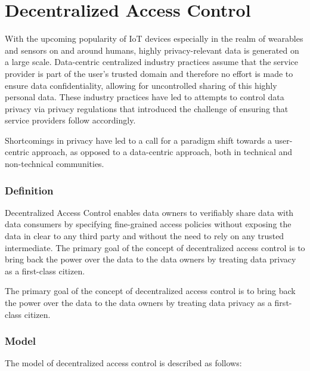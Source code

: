 \documentclass[conference]{IEEEtran}
\begin{document}
\section{Decentralized Access Control}
With the upcoming popularity of IoT devices especially in the realm of wearables and sensors on and around humans, highly privacy-relevant data is generated on a large scale. \cite{zhang_cloud_2015}
Data-centric centralized industry practices assume that the service provider is part of the user's trusted domain and therefore no effort is made to ensure data confidentiality, allowing for uncontrolled sharing of this highly personal data. \cite{shafagh_droplet_2020}
These industry practices have led to attempts to control data privacy via privacy regulations that introduced the challenge of ensuring that service providers follow accordingly. \cite{noauthor_general_nodate}

Shortcomings in privacy have led to a call for a paradigm shift towards a user-centric approach, as opposed to a data-centric approach, both in technical and non-technical communities. \cite{ernstberger_sok_2023, shafagh_droplet_2020}

\subsubsection{Definition}
Decentralized Access Control enables data owners to verifiably share data with data consumers by specifying fine-grained access policies without exposing the data in clear to any third party and without the need to rely on any trusted intermediate.
The primary goal of the concept of decentralized access control is to bring back the power over the data to the data owners by treating data privacy as a first-class citizen. \cite{ernstberger_sok_2023}

The primary goal of the concept of decentralized access control is to bring back the power over the data to the data owners by treating data privacy as a first-class citizen.

\subsubsection{Model}

The model of decentralized access control is described as follows:
\end{document}
